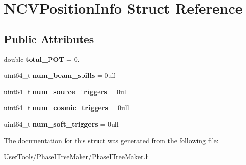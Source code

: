 \hypertarget{structNCVPositionInfo}{\section{N\-C\-V\-Position\-Info Struct Reference}
\label{structNCVPositionInfo}
}
\subsection*{Public Attributes}
\begin{DoxyCompactItemize}
\item 
\hypertarget{structNCVPositionInfo_ace4afc2346cc29522e1732f9f41de8dd}{double {\bfseries total\-\_\-\-P\-O\-T} = 0.}\label{structNCVPositionInfo_ace4afc2346cc29522e1732f9f41de8dd}

\item 
\hypertarget{structNCVPositionInfo_a813f7edef83ad94a009257ece03392dd}{uint64\-\_\-t {\bfseries num\-\_\-beam\-\_\-spills} = 0ull}\label{structNCVPositionInfo_a813f7edef83ad94a009257ece03392dd}

\item 
\hypertarget{structNCVPositionInfo_aa9303f33637e7e3f3a47dbc1ec915e97}{uint64\-\_\-t {\bfseries num\-\_\-source\-\_\-triggers} = 0ull}\label{structNCVPositionInfo_aa9303f33637e7e3f3a47dbc1ec915e97}

\item 
\hypertarget{structNCVPositionInfo_a5e5afcbdc00981d16728e325c0a8eca9}{uint64\-\_\-t {\bfseries num\-\_\-cosmic\-\_\-triggers} = 0ull}\label{structNCVPositionInfo_a5e5afcbdc00981d16728e325c0a8eca9}

\item 
\hypertarget{structNCVPositionInfo_ac4c3befd94418e04f02d2549569bd5eb}{uint64\-\_\-t {\bfseries num\-\_\-soft\-\_\-triggers} = 0ull}\label{structNCVPositionInfo_ac4c3befd94418e04f02d2549569bd5eb}

\end{DoxyCompactItemize}


The documentation for this struct was generated from the following file\-:\begin{DoxyCompactItemize}
\item 
User\-Tools/\-Phase\-I\-Tree\-Maker/Phase\-I\-Tree\-Maker.\-h\end{DoxyCompactItemize}
